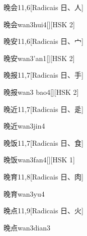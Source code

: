 \begin{entry}{晚会}{11,6}[Radicais ⽇、⼈]
  \begin{phonetics}{晚会}{wan3hui4}[][HSK 2]
  \end{phonetics}
\end{entry}

\begin{entry}{晚安}{11,6}[Radicais ⽇、⼧]
  \begin{phonetics}{晚安}{wan3'an1}[][HSK 2]
  \end{phonetics}
\end{entry}

\begin{entry}{晚报}{11,7}[Radicais ⽇、⼿]
  \begin{phonetics}{晚报}{wan3 bao4}[][HSK 2]
  \end{phonetics}
\end{entry}

\begin{entry}{晚近}{11,7}[Radicais ⽇、⾡]
  \begin{phonetics}{晚近}{wan3jin4}
  \end{phonetics}
\end{entry}

\begin{entry}{晚饭}{11,7}[Radicais ⽇、⾷]
  \begin{phonetics}{晚饭}{wan3fan4}[][HSK 1]
  \end{phonetics}
\end{entry}

\begin{entry}{晚育}{11,8}[Radicais ⽇、⾁]
  \begin{phonetics}{晚育}{wan3yu4}
  \end{phonetics}
\end{entry}

\begin{entry}{晚点}{11,9}[Radicais ⽇、⽕]
  \begin{phonetics}{晚点}{wan3dian3}
  \end{phonetics}
\end{entry}

